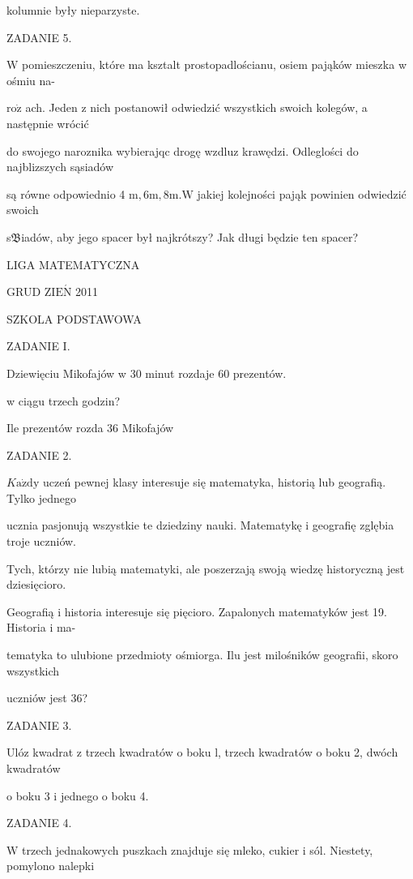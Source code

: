 \documentclass[a4paper,12pt]{article}
\begin{document}
kolumnie były nieparzyste.

ZADANIE 5.

$\mathrm{W}$ pomieszczeniu, które ma ksztalt prostopadlościanu, osiem pająków mieszka w ośmiu na-

$\mathrm{r}\mathrm{o}\dot{\mathrm{z}}$ ach. Jeden z nich postanowił odwiedzić wszystkich swoich kolegów, a następnie wrócić

do swojego naroznika wybierajqc drogę wzdluz krawędzi. Odleglości do najblizszych sąsiadów

są równe odpowiednio 4 $\mathrm{m}, 6\mathrm{m}, 8\mathrm{m}. \mathrm{W}$ jakiej kolejności pająk powinien odwiedzić swoich

s$\mathfrak{B}$iadów, aby jego spacer był najkrótszy? Jak długi będzie ten spacer?






LIGA MATEMATYCZNA

GRUD Z$\mathrm{I}\mathrm{E}\acute{\mathrm{N}}$ 2011

SZKOLA PODSTAWOWA

ZADANIE I.

Dziewięciu Mikofajów w 30 minut rozdaje 60 prezentów.

w ciągu trzech godzin?

Ile prezentów rozda 36 Mikofajów

ZADANIE 2.

$K\mathrm{a}\dot{\mathrm{z}}\mathrm{d}\mathrm{y}$ uczeń pewnej klasy interesuje się matematyka, historią lub geografią. Tylko jednego

ucznia pasjonują wszystkie te dziedziny nauki. Matematykę i geografię zglębia troje uczniów.

Tych, którzy nie lubią matematyki, ale poszerzają swoją wiedzę historyczną jest dziesięcioro.

Geografią i historia interesuje się pięcioro. Zapalonych matematyków jest 19. Historia i ma-

tematyka to ulubione przedmioty ośmiorga. Ilu jest milośników geografii, skoro wszystkich

uczniów jest 36?

ZADANIE 3.

Ulóz kwadrat z trzech kwadratów o boku l, trzech kwadratów o boku 2, dwóch kwadratów

o boku 3 i jednego o boku 4.

ZADANIE 4.

$\mathrm{W}$ trzech jednakowych puszkach znajduje się mleko, cukier i sól. Niestety, pomylono nalepki
\end{document}
